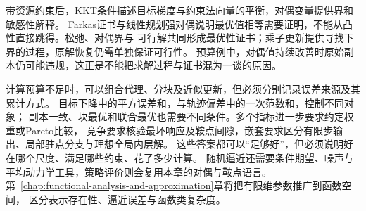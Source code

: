 带资源约束后，KKT条件描述目标梯度与约束法向量的平衡，对偶变量提供界和敏感性解释。
Farkas证书与线性规划强对偶说明最优值相等需要证明，不能从凸性直接跳得。松弛、对偶界与
可行解共同形成最优性证书；乘子更新提供寻找下界的过程，原解恢复仍需单独保证可行性。
预算例中，对偶值持续改善时原始副本仍可能违规，这正是不能把求解过程与证书混为一谈的原因。

\begin{samepage}
计算预算不足时，可以组合代理、分块及近似更新，但必须分别记录误差来源及其累计方式。
目标下降中的平方误差和，与轨迹偏差中的一次范数和，控制不同对象；
副本一致、块最优和联合最优也需要不同条件。多个指标进一步要求约定权重或Pareto比较，
竞争要求核验最坏响应及鞍点间隙，嵌套要求区分有限步输出、局部驻点分支与理想全局内层解。
这些答案都可以“足够好”，但必须说明好在哪个尺度、满足哪些约束、花了多少计算。
随机逼近还需要条件期望、噪声与平均动力学工具，策略评价则会复用本章的对偶与鞍点语言。
第~\ref{chap:functional-analysis-and-approximation}章将把有限维参数推广到函数空间，
区分表示存在性、逼近误差与函数类复杂度。

\end{samepage}
